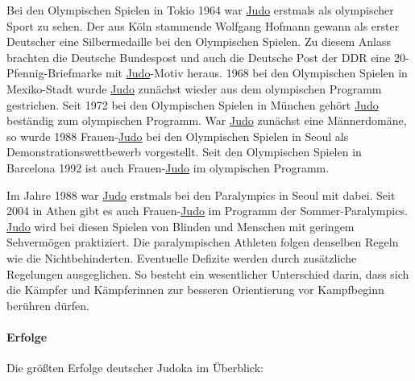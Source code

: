 \documentclass[justified, a4paper, notitlepage, captions=tableheading, nobib]{tufte-handout}
\begin{document}
Bei den Olympischen Spielen in Tokio 1964 war \hyperref[org80c3996]{Judo} erstmals als olympischer Sport zu sehen. Der aus Köln stammende Wolfgang Hofmann gewann als erster Deutscher eine Silbermedaille bei den Olympischen Spielen. Zu diesem Anlass brachten die Deutsche Bundespost und auch die Deutsche Post der DDR eine 20-Pfennig-Briefmarke mit \hyperref[org80c3996]{Judo}-Motiv heraus. 1968 bei den Olympischen Spielen in Mexiko-Stadt wurde \hyperref[org80c3996]{Judo} zunächst wieder aus dem olympischen Programm gestrichen. Seit 1972 bei den Olympischen Spielen in München gehört \hyperref[org80c3996]{Judo} beständig zum olympischen Programm. War \hyperref[org80c3996]{Judo} zunächst eine Männerdomäne, so wurde 1988 Frauen-\hyperref[org80c3996]{Judo} bei den Olympischen Spielen in Seoul als Demonstrationswettbewerb vorgestellt. Seit den Olympischen Spielen in Barcelona 1992 ist auch Frauen-\hyperref[org80c3996]{Judo} im olympischen Programm.

Im Jahre 1988 war \hyperref[org80c3996]{Judo} erstmals bei den Paralympics in Seoul mit dabei. Seit 2004 in Athen gibt es auch Frauen-\hyperref[org80c3996]{Judo} im Programm der Sommer-Paralympics. \hyperref[org80c3996]{Judo} wird bei diesen Spielen von Blinden und Menschen mit geringem Sehvermögen praktiziert. Die paralympischen Athleten folgen denselben Regeln wie die Nichtbehinderten. Eventuelle Defizite werden durch zusätzliche Regelungen ausgeglichen. So besteht ein wesentlicher Unterschied darin, dass sich die Kämpfer und Kämpferinnen zur besseren Orientierung vor Kampfbeginn berühren dürfen. 

\paragraph{Erfolge}
\label{sec:org303d759}
Die größten Erfolge deutscher Judoka im Überblick:
\end{document}
